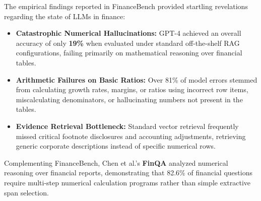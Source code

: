 \documentclass[conference]{IEEEtran}
\begin{document}
The empirical findings reported in FinanceBench provided startling revelations regarding the state of LLMs in finance:
\begin{itemize}
    \item \textbf{Catastrophic Numerical Hallucinations:} GPT-4 achieved an overall accuracy of only \textbf{19\%} when evaluated under standard off-the-shelf RAG configurations, failing primarily on mathematical reasoning over financial tables.
    \item \textbf{Arithmetic Failures on Basic Ratios:} Over 81\% of model errors stemmed from calculating growth rates, margins, or ratios using incorrect row items, miscalculating denominators, or hallucinating numbers not present in the tables.
    \item \textbf{Evidence Retrieval Bottleneck:} Standard vector retrieval frequently missed critical footnote disclosures and accounting adjustments, retrieving generic corporate descriptions instead of specific numerical rows.
\end{itemize}

Complementing FinanceBench, Chen et al.'s \textbf{FinQA} \cite{chen2021finqa} analyzed numerical reasoning over financial reports, demonstrating that 82.6\% of financial questions require multi-step numerical calculation programs rather than simple extractive span selection.
\end{document}
